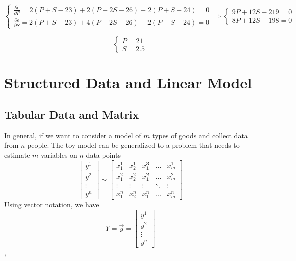 \documentclass[12pt, oneside]{article}
\begin{document}
\begin{equation}
\begin{cases}
\frac{\partial \epsilon }{\partial P}=2(P+S-23)+2(P+2S-26)+2(P+S-24)=0\\
\frac{\partial \epsilon}{\partial S}=2(P+S-23)+4(P+2S-26)+2(P+S-24)=0
\end{cases}
\Longrightarrow
\begin{cases}
9P+12S-219=0\\
8P+12S-198=0
\end{cases}
\end{equation}

\begin{equation}
\begin{cases}
P=21\\
S=2.5
\end{cases}
\end{equation}

\section{Structured Data and Linear Model}

\subsection{Tabular Data and Matrix}
In general, if we want to consider a model of $m$ types of goods and collect data from $n$ people. The toy model can be generalized to a problem that needs to estimate $m$ variables on $n$ data points
\[
\begin{bmatrix}
    y^1      \\
    y^2      \\
    \vdots \\
    y^n    
\end{bmatrix}
\sim
\begin{bmatrix}
    x_1^1 & x_2^1  & x_1^3  & \dots  & x_m^1 \\
    x_1^2 & x_2^2  & x_1^2  & \dots  & x_m^2\\
    \vdots& \vdots & \vdots & \ddots & \vdots \\
  	x_1^n & x_2^n  & x_1^n  & \dots  & x_m^n
\end{bmatrix}
\]
Using vector notation, we have
\[
Y=\vec{y}=
\begin{bmatrix}
    y^1      \\
    y^2      \\
    \vdots \\
    y^n    
\end{bmatrix}\]
,
\end{document}
